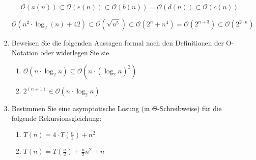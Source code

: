 \documentclass{lehramt-informatik-aufgabe}
\begin{document}
\begin{enumerate}
\begin{liAntwort}
\begin{displaymath}
\mathcal{O}(a (n)) \subset \mathcal{O}(e(n)) \subset \mathcal{O}(b(n)) = \mathcal{O}(d(n)) \subset \mathcal{O}(c(n))
\end{displaymath}

\begin{displaymath}
\mathcal{O}(n^2 \cdot \log_2(n) + 42) \subset
\mathcal{O}(\sqrt{n^5}) \subset
\mathcal{O}(2^n + n^4) =
\mathcal{O}(2^{n+3}) \subset
\mathcal{O}(2^{2 \cdot n})
\end{displaymath}
\end{liAntwort}


\item Beweisen Sie die folgenden Aussagen formal nach den Definitionen
der O-Notation oder widerlegen Sie sie.

\begin{enumerate}


\item $\mathcal{O}(n \cdot \log_2 n) \subseteq \mathcal{O}(n \cdot (\log_2 n)^2)$


\item $2^{(n+1)} \in \mathcal{O}(n \cdot \log_2 n)$
\end{enumerate}


\item Bestimmen Sie eine asymptotische Lösung (in $\Theta$-Schreibweise) für
die folgende Rekursionsgleichung:

\begin{enumerate}


\item $T(n) = 4 \cdot T(\frac{n}{2}) + n^2$


\item $T(n) =  T(\frac{n}{2}) +\frac{n}{2} n^2 + n$
\end{enumerate}

\end{enumerate}
\end{document}
